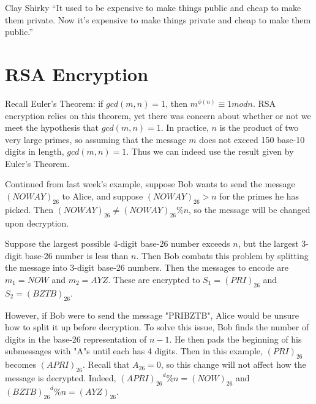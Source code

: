 
\begin{chapquote}{Clay Shirky}
``It used to be expensive to make things public and cheap to make them private. Now it’s expensive to make things private and cheap to make them public.''
\end{chapquote}

\section{RSA Encryption}

Recall Euler's Theorem: if $ gcd(m,n) = 1 $, then $ m^{ \phi (n)} \equiv 1 modn $. RSA encryption relies on this theorem, yet there was concern about whether or not we meet the hypothesis that $ gcd(m,n) = 1 $. In practice, $n$ is the product of two very large primes, so assuming that the message $m$ does not exceed 150 base-10 digits in length, $ gcd(m,n) = 1 $. Thus we can indeed use the result given by Euler's Theorem.

\begin{example}
Continued from last week's example, suppose Bob wants to send the message $ (NOWAY)_{26}$ to Alice, and suppose $ (NOWAY)_{26} > n$ for the primes he has picked. Then $ (NOWAY)_{26} \neq  (NOWAY)_{26} \% n$, so the message will be changed upon decryption.

Suppose the largest possible 4-digit base-26 number exceeds $n$, but the largest 3-digit base-26 number is less than $n$. Then Bob combats this problem by splitting the message into 3-digit base-26 numbers. Then the messages to encode are $m_1 = NOW$ and $ m_2 = AYZ$. These are encrypted to $S_1 = (PRI)_{26}$ and $S_2 = (BZTB)_{26}$.

However, if Bob were to send the message "PRIBZTB", Alice would be unsure how to split it up before decryption. To solve this issue, Bob finds the number of digits in the base-26 representation of $n-1$. He then pads the beginning of his submessages with "A"s until each has 4 digits. Then in this example, $(PRI)_{26}$ becomes $(APRI)_{26}$. Recall that $A_{26} = 0$, so this change will not affect how the message is decrypted. Indeed, ${(APRI)_{26}}^{d} \% n = (NOW)_{26}$ and ${(BZTB)_{26}}^{d} \% n = (AYZ)_{26}$.
\end{example}

